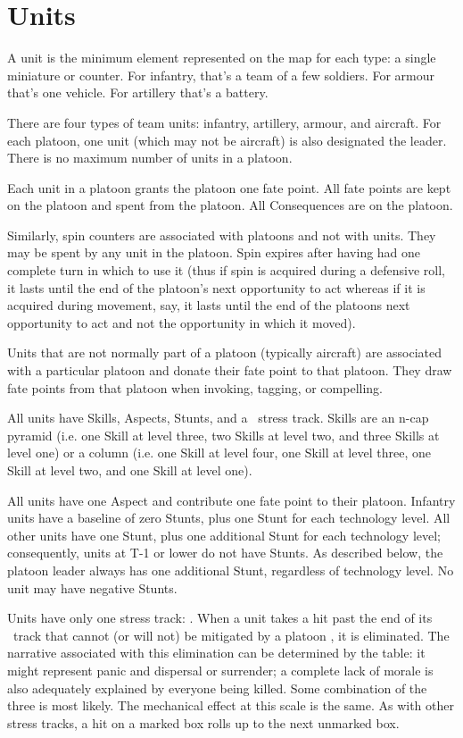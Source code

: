 \section{Units}\label{sec:Units}
\vfil

A unit is the minimum element represented on the map for each type: a single miniature or counter. For infantry, that's a team of a few soldiers. For armour that's one vehicle. For artillery that's a battery.

There are four types of team units: infantry, artillery, armour, and aircraft. For each platoon, one unit (which may not be aircraft) is also designated the leader. There is no maximum number of units in a platoon.

Each unit in a platoon grants the platoon one fate point. All fate points are kept on the platoon and spent from the platoon. All Consequences are on the platoon.

Similarly, spin counters are associated with platoons and not with units. They may be spent by any unit in the platoon. Spin expires after having had one complete turn in which to use it (thus if spin is acquired during a defensive roll, it lasts until the end of the platoon's next opportunity to act whereas if it is acquired during movement, say, it lasts until the end of the platoons next opportunity to act and not the opportunity in which it moved).

Units that are not normally part of a platoon (typically aircraft) are associated with a particular platoon and donate their fate point to that platoon. They draw fate points from that platoon when invoking, tagging, or compelling.

All units have Skills, Aspects, Stunts, and a \Morale\ stress track. Skills are an n-cap pyramid (i.e. one Skill at level three, two Skills at level two, and three Skills at level one) or a column (i.e. one Skill at level four, one Skill at level three, one Skill at level two, and one Skill at level one).

All units have one Aspect and contribute one fate point to their platoon. Infantry units have a baseline of zero Stunts, plus one Stunt for each technology level. All other units have one Stunt, plus one additional Stunt for each technology level; consequently, units at T-1 or lower do not have Stunts. As described below, the platoon leader always has one additional Stunt, regardless of technology level. No unit may have negative Stunts.

Units have only one stress track: \Morale. When a unit takes a hit past the end of its \Morale\ track that cannot (or will not) be mitigated by a platoon \Consequence, it is eliminated. The narrative associated with this elimination can be determined by the table: it might represent panic and dispersal or surrender; a complete lack of morale is also adequately explained by everyone being killed. Some combination of the three is most likely.  The mechanical effect at this scale is the same. As with other stress tracks, a hit on a marked box rolls up to the next unmarked box.

